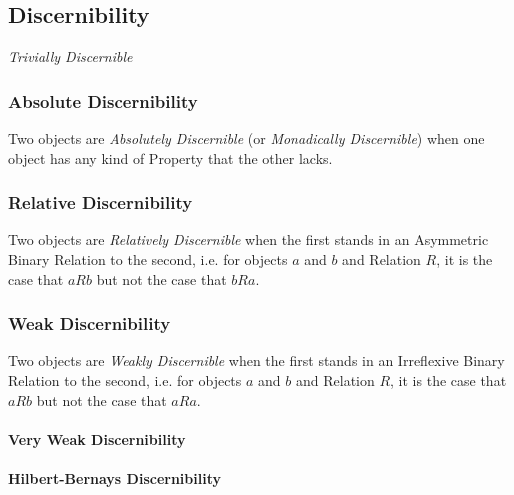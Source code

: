 \subsection{Discernibility}\label{sec:discernibility}
\cite{ladyman-linnebo-pettigrew11}

\emph{Trivially Discernible}



\subsubsection{Absolute Discernibility}\label{sec:absolute_discernibility}

Two objects are \emph{Absolutely Discernible} (or \emph{Monadically
  Discernible}) when one object has any kind of Property that the
other lacks.



\subsubsection{Relative Discernibility}\label{sec:relative_discernibility}

Two objects are \emph{Relatively Discernible} when the first stands in
an Asymmetric Binary Relation to the second, i.e. for objects $a$ and
$b$ and Relation $R$, it is the case that $aRb$ but not the case that
$bRa$.



\subsubsection{Weak Discernibility}\label{sec:weak_discernibility}

Two objects are \emph{Weakly Discernible} when the first stands in an
Irreflexive Binary Relation to the second, i.e. for objects $a$ and
$b$ and Relation $R$, it is the case that $aRb$ but not the case that
$aRa$.

\paragraph{Very Weak Discernibility}\label{sec:very_weak_discernibility}\hfill

\paragraph{Hilbert-Bernays Discernibility}\hfill
\label{sec:hilbert_bernays_discernibility}

